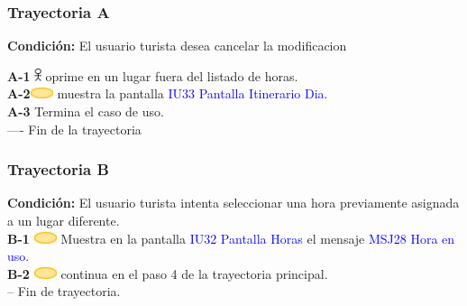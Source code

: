 \subsubsection{\textbf{Trayectoria A}}

\textbf{Condición:} El usuario turista desea cancelar la modificacion \par

     \textbf{A-1} \includegraphics[width=0.0150\textwidth]{Figuras/persona.png} oprime en un lugar fuera del listado de horas.\\
    \textbf{A-2}\includegraphics[width=0.0500\textwidth]{Figuras/sistema.png} muestra la pantalla \textcolor{blue}{IU33 Pantalla Itinerario Dia}. \\
   \textbf{A-3} Termina el caso de uso. \\
   ---- Fin de la trayectoria\par


\subsubsection{\textbf{Trayectoria B}}
\textbf{Condición:} El usuario turista intenta seleccionar una hora previamente asignada a un lugar diferente.\\
\textbf{B-1} \includegraphics[width=0.0500\textwidth]{Figuras/sistema.png} Muestra en la pantalla \textcolor{blue}{IU32 Pantalla Horas} el mensaje \textcolor{blue}{MSJ28 Hora en uso.} \\

\textbf{B-2} \includegraphics[width=0.0500\textwidth]{Figuras/sistema.png} continua en el paso 4 de la trayectoria principal.\\
-- Fin de trayectoria.\par

\pagebreak
